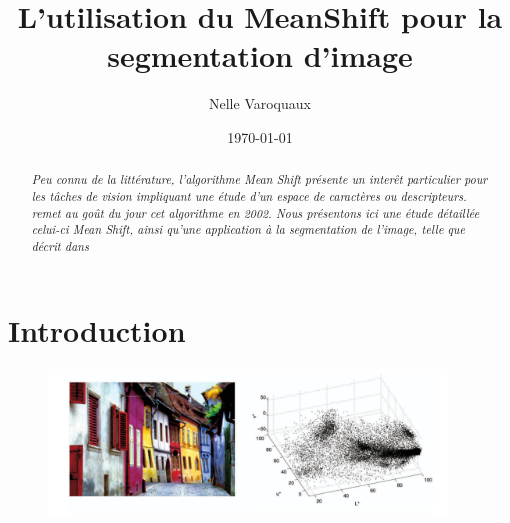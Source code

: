 \documentclass{article}
\date{\today}
\title{L'utilisation du MeanShift pour la segmentation d'image}
\author{Nelle Varoquaux}
\begin{document}
\maketitle

\begin{abstract} \textit{Peu connu de la littérature, l'algorithme Mean Shift
présente un interêt particulier pour les tâches de vision impliquant une étude
d'un espace de caractères ou descripteurs. \cite{my_article} remet au goût du
jour cet algorithme en 2002. Nous présentons ici une étude détaillée celui-ci
Mean Shift, ainsi qu'une application à la segmentation de l'image, telle que
décrit dans \cite{my_article}} \end{abstract}

\section{Introduction}

\begin{figure}
\includegraphics[width=400px]{images/color_space.png}
\end{figure}
\end{document}
